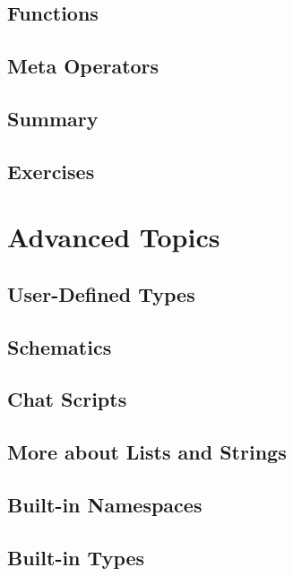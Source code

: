 \documentclass[oneside]{book}
\begin{document}
\section{Functions}
\blindtext

\section{Meta Operators}
\blindtext

\section{Summary}
\blindtext

\section{Exercises}
\blindtext

\chapter{Advanced Topics}
\blindtext

\section{User-Defined Types}
\blindtext

\section{Schematics}
\blindtext

\section{Chat Scripts}
\blindtext

\section{More about Lists and Strings}
\blindtext

\section{Built-in Namespaces}
\blindtext

\section{Built-in Types}
\blindtext
\end{document}
